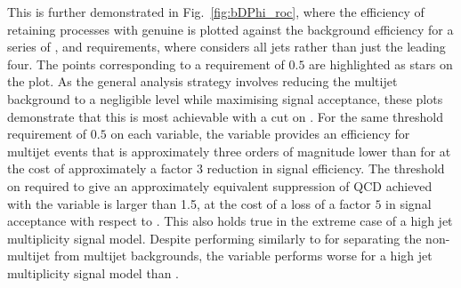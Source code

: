 This is further demonstrated in Fig.~\ref{fig:bDPhi_roc}, where the
efficiency of retaining processes with genuine \mht is plotted against
the \QCD background efficiency for a series of \bdphi, \dphimhtj and
\dphimhtjall requirements, where \dphimhtjall considers all jets rather than
just the leading four. The points corresponding to a requirement of $0.5$ are highlighted
as stars on the plot. As the general analysis strategy involves reducing
the \QCD multijet background to a negligible level while maximising
signal acceptance, these plots demonstrate that this is most
achievable with a cut on \bdphi. For the same threshold requirement of
$0.5$ on each variable, the \bdphi variable provides an efficiency for
multijet events that is approximately three orders of magnitude lower
than for \dphimhtj at the cost of approximately a factor $3$ reduction
in signal efficiency. The threshold on \bdphi required to give an
approximately equivalent suppression of QCD achieved with the
\dphimhtj variable is larger than 1.5, at the cost of a loss of a
factor $5$ in signal acceptance with respect to \bdphi. This also holds true in
the extreme case of a high jet multiplicity signal model.
Despite performing similarly to \bdphi for separating
the non-multijet from multijet backgrounds, the \dphimhtjall variable
performs worse for a high jet multiplicity signal model than \bdphi.

